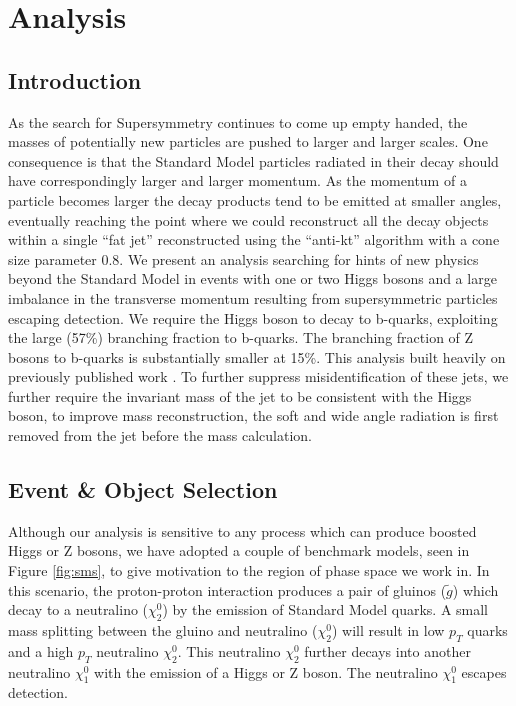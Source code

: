 \chapter{Analysis}
\label{chap:analysis}

\section{Introduction}

As the search for Supersymmetry continues to come up empty handed, the masses of potentially new particles are pushed to larger and larger scales. One consequence is that the Standard Model particles radiated in their decay should have correspondingly larger and larger momentum. As the momentum of a particle becomes larger the decay products tend to be emitted at smaller angles, eventually reaching the point where we could reconstruct all the decay objects within a single ``fat jet'' reconstructed using the ``anti-kt'' algorithm with a cone size parameter 0.8. We present an analysis searching for hints of new physics beyond the Standard Model in events with one or two Higgs bosons and a large imbalance in the transverse momentum resulting from supersymmetric particles escaping detection. We require the Higgs boson to decay to b-quarks, exploiting the large (57\%) branching fraction to b-quarks. The branching fraction of Z bosons to b-quarks is substantially smaller at 15\%. This analysis built heavily on previously published work \cite{SUS16033} \cite{SUS15002}. To further suppress misidentification of these jets, we further require the invariant mass of the jet to be consistent with the Higgs boson, to improve mass reconstruction, the soft and wide angle radiation is first removed from the jet before the mass calculation.

\section{Event \& Object Selection}

Although our analysis is sensitive to any process which can produce boosted Higgs or Z bosons, we have adopted a couple of benchmark models, seen in Figure \ref{fig:sms}, to give motivation to the region of phase space we work in. In this scenario, the proton-proton interaction produces a pair of gluinos ($\tilde{g}$) which decay to a neutralino ($\chi_{2}^{0}$) by the emission of Standard Model quarks. A small mass splitting between the gluino and neutralino ($\chi_{2}^{0}$) will result in low $p_{T}$ quarks and a high $p_{T}$ neutralino $\chi_{2}^{0}$. This neutralino $\chi_{2}^{0}$ further decays into another neutralino $\chi_{1}^{0}$ with the emission of a Higgs or Z boson. The neutralino $\chi_{1}^{0}$ escapes detection.

